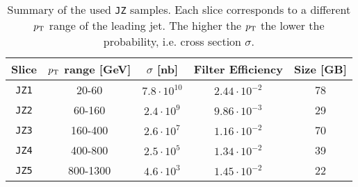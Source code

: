 \begin{table}[!htb]
    \centering
    \caption{Summary of the used \texttt{JZ} samples. Each slice corresponds to a different $p_\text{T}$ range of the leading jet. The higher the $p_\text{T}$ the lower the probability, i.e. cross section $\sigma$.}
    \label{tab:jz}
    \begin{tabular}{ccccc}
    \toprule
        Slice & $p_\text{T}$ range [GeV] & $\sigma$ [nb] & Filter Efficiency & Size [GB] \\
    \midrule
        \texttt{JZ1} & 20-60 & $7.8\cdot10^{10}$ & $2.44\cdot10^{-2}$ & 78    \\
        \texttt{JZ2} & 60-160 & $2.4\cdot10^{9}$ & $9.86\cdot10^{-3}$ & 29    \\
        \texttt{JZ3} & 160-400 & $2.6\cdot10^{7}$ & $1.16\cdot10^{-2}$ & 70    \\
        \texttt{JZ4} & 400-800 & $2.5\cdot10^{5}$ & $1.34\cdot10^{-2}$ & 39    \\
        \texttt{JZ5} & 800-1300 & $4.6\cdot10^{3}$ & $1.45\cdot10^{-2}$ & 22    \\
    \bottomrule
    \end{tabular}
\end{table}


















